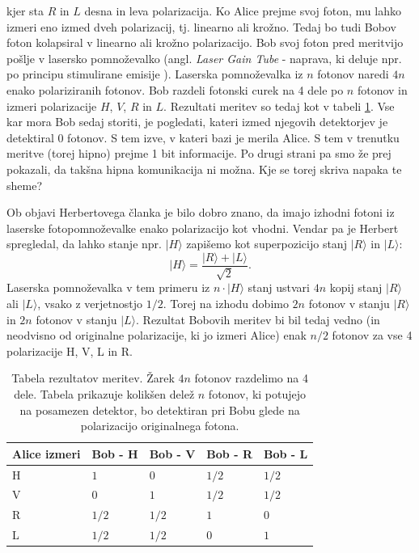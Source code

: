 \documentclass[12pt]{article}
\begin{document}
kjer sta $R$ in $L$ desna in leva polarizacija. Ko Alice prejme svoj foton, mu lahko izmeri eno izmed dveh polarizacij, tj. linearno ali krožno. Tedaj bo tudi Bobov foton kolapsiral v linearno ali krožno polarizacijo. Bob svoj foton pred meritvijo pošlje v lasersko pomnoževalko (angl. \emph{Laser Gain Tube} - naprava, ki deluje npr. po principu stimulirane emisije \cite{woottersSingleQuantumCannot1982}). Laserska pomnoževalka iz $n$ fotonov naredi $4n$ enako polariziranih fotonov. Bob razdeli fotonski curek na 4 dele po $n$ fotonov in izmeri polarizacije $H$, $V$, $R$ in $L$. Rezultati meritev so tedaj kot v tabeli \ref{tab:bob}. Vse kar mora Bob sedaj storiti, je pogledati, kateri izmed njegovih detektorjev je detektiral 0 fotonov. S tem izve, v kateri bazi je merila Alice. S tem v trenutku meritve (torej hipno) prejme 1 bit informacije. Po drugi strani pa smo že prej pokazali, da takšna hipna komunikacija ni možna. Kje se torej skriva napaka te sheme? \cite{marcocerezoEntangledParticlesFaster2015}
\par
Ob objavi Herbertovega članka je bilo dobro znano, da imajo izhodni fotoni iz laserske fotopomnoževalke enako polarizacijo kot vhodni. Vendar pa je Herbert spregledal, da lahko stanje npr. $| H \rangle$ zapišemo kot superpozicijo stanj $| R \rangle$ in $| L \rangle$:
\begin{equation}
| H \rangle = \frac{| R\rangle + | L \rangle}{\sqrt{2}}.
\end{equation} 
Laserska pomnoževalka v tem primeru iz $n \cdot |H\rangle$ stanj ustvari $4n$ kopij stanj $| R \rangle$ ali $| L \rangle$, vsako z verjetnostjo $1/2$. Torej na izhodu dobimo $2n$ fotonov v stanju $| R \rangle$ in $2n$ fotonov v stanju $| L \rangle$. Rezultat Bobovih meritev bi bil tedaj vedno (in neodvisno od originalne polarizacije, ki jo izmeri Alice) enak $n/2$ fotonov za vse 4 polarizacije H, V, L in R. \cite{marcocerezoEntangledParticlesFaster2015}

\begin{table}[]
\centering
\begin{tabular}{|l|l|l|l|l|}
\hline
\textbf{Alice izmeri} & \textbf{Bob - H} & \textbf{Bob - V} & \textbf{Bob - R} & \textbf{Bob - L} \\ \hline
H                     & $ 1 $            & $ 0 $            & $ 1/2 $ & $ 1/2 $ \\ \hline
V                     & $ 0 $            & $ 1 $            & $ 1/2 $ & $ 1/2 $ \\ \hline
R                     & $ 1/2 $          & $ 1/2 $          & $ 1 $   & $ 0 $   \\ \hline
L                     & $ 1/2 $          & $ 1/2 $          & $ 0 $   & $ 1 $   \\ \hline
\end{tabular}
\caption{Tabela rezultatov meritev. Žarek $4n$ fotonov razdelimo na 4 dele. Tabela prikazuje kolikšen delež $n$ fotonov, ki potujejo na posamezen detektor, bo detektiran pri Bobu glede na polarizacijo originalnega fotona.}
\label{tab:bob}
\end{table}
\end{document}
